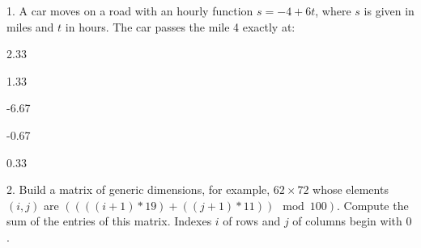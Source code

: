 \documentclass[10pt,brazil,a4paper]{exam}
\begin{document}
 \hspace{0mm} 1. A car moves on a road with an hourly function
$s=-4 + 6t$, where $s$ is
given in miles and $t$ in hours. The car passes
the mile 4 exactly at:

\vspace{0mm}

\begin{oneparchoices}
\choice {}\hspace{2.0mm}2.33

\choice {}1.33

\choice {}\hspace{2.0mm}-6.67

\choice {}\hspace{2.0mm}-0.67

\choice {}\hspace{2.0mm}0.33

\end{oneparchoices}\vspace{1mm}



 \hspace{0mm} 2. %
Build a matrix of generic dimensions, for example, $62 \times 72$ whose elements $(i,j)$ are $((((i+1) * 19) + ((j+1) * 11)) \mod{100})$. Compute the sum of the entries of this matrix. Indexes $i$ of rows and $j$ of columns begin with $0$.

\vspace{0mm}
\end{document}
